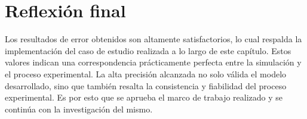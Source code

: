 \section{Reflexión final}

Los resultados de error obtenidos son altamente satisfactorios, lo cual respalda la implementación del caso de estudio realizada a lo largo de este capítulo. Estos valores indican una correspondencia prácticamente perfecta entre la simulación y el proceso experimental. La alta precisión alcanzada no solo válida el modelo desarrollado, sino que también resalta la consistencia y fiabilidad del proceso experimental. Es por esto que se aprueba el marco de trabajo realizado y se continúa con la investigación del mismo.
